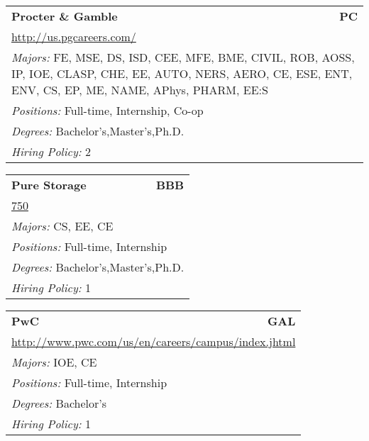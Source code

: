 \documentclass[twoside]{article}
\begin{document}
\begin{center}
\begin{multicols}{3}
\begin{FlushLeft}
\begin{minipage}{\columnwidth}
\end{minipage}
 
\begin{minipage}{\columnwidth}\begin{tabularx}{.95\columnwidth}{Xr}
                 {\Large\bf Procter \& Gamble} & {\Large\bf PC}\\
    \multicolumn{2}{p{.95\columnwidth}}{\url{http://us.pgcareers.com/}}\\
    \multicolumn{2}{p{.95\columnwidth}}{\emph{Majors:} FE, MSE, DS, ISD, CEE, MFE, BME, CIVIL, ROB, AOSS, IP, IOE, CLASP, CHE, EE, AUTO, NERS, AERO, CE, ESE, ENT, ENV, CS, EP, ME, NAME, APhys, PHARM, EE:S}\\
    \multicolumn{2}{p{.95\columnwidth}}{\emph{Positions:} Full-time, Internship, Co-op}\\
    \multicolumn{2}{p{.95\columnwidth}}{\emph{Degrees:} Bachelor's,Master's,Ph.D.}\\
    \multicolumn{2}{p{.95\columnwidth}}{\emph{Hiring Policy:} 2}\\
    \end{tabularx}
    
\end{minipage}
 
\begin{minipage}{\columnwidth}\begin{tabularx}{.95\columnwidth}{Xr}
                 {\Large\bf Pure Storage} & {\Large\bf BBB}\\
    \multicolumn{2}{p{.95\columnwidth}}{\url{750}}\\
    \multicolumn{2}{p{.95\columnwidth}}{\emph{Majors:} CS, EE, CE}\\
    \multicolumn{2}{p{.95\columnwidth}}{\emph{Positions:} Full-time, Internship}\\
    \multicolumn{2}{p{.95\columnwidth}}{\emph{Degrees:} Bachelor's,Master's,Ph.D.}\\
    \multicolumn{2}{p{.95\columnwidth}}{\emph{Hiring Policy:} 1}\\
    \end{tabularx}
    
\end{minipage}
 
\begin{minipage}{\columnwidth}\begin{tabularx}{.95\columnwidth}{Xr}
                 {\Large\bf PwC} & {\Large\bf GAL}\\
    \multicolumn{2}{p{.95\columnwidth}}{\url{http://www.pwc.com/us/en/careers/campus/index.jhtml}}\\
    \multicolumn{2}{p{.95\columnwidth}}{\emph{Majors:} IOE, CE}\\
    \multicolumn{2}{p{.95\columnwidth}}{\emph{Positions:} Full-time, Internship}\\
    \multicolumn{2}{p{.95\columnwidth}}{\emph{Degrees:} Bachelor's}\\
    \multicolumn{2}{p{.95\columnwidth}}{\emph{Hiring Policy:} 1}\\
    \end{tabularx}
    

\end{minipage}
\end{FlushLeft}
\end{multicols}
\end{center}
\end{document}
